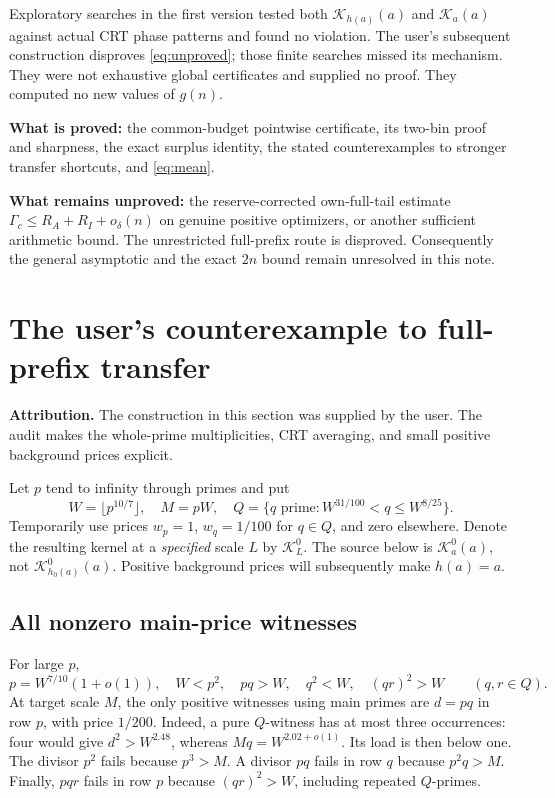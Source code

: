 \documentclass[a4paper,11pt]{article}
\theoremstyle{remark}\newtheorem{remark}[theorem]{Remark}
\newcommand{\K}{\mathcal K}
\begin{document}
Exploratory searches in the first version tested both $\K_{h(a)}(a)$ and $\K_a(a)$ against actual CRT phase patterns and found no violation. The user's subsequent construction disproves \eqref{eq:unproved}; those finite searches missed its mechanism. They were not exhaustive global certificates and supplied no proof. They computed no new values of $g(n)$.

\noindent\textbf{What is proved:} the common-budget pointwise certificate, its two-bin proof and sharpness, the exact surplus identity, the stated counterexamples to stronger transfer shortcuts, and \eqref{eq:mean}.

\medskip
\noindent\textbf{What remains unproved:} the reserve-corrected own-full-tail estimate $\Gamma_c\le R_A+R_I+o_\delta(n)$ on genuine positive optimizers, or another sufficient arithmetic bound. The unrestricted full-prefix route is disproved. Consequently the general asymptotic and the exact $2n$ bound remain unresolved in this note.

\section{The user's counterexample to full-prefix transfer}\label{sec:user-counter}
\textbf{Attribution.} The construction in this section was supplied by the user. The audit makes the whole-prime multiplicities, CRT averaging, and small positive background prices explicit.

Let $p$ tend to infinity through primes and put
\[
 W=\lfloor p^{10/7}\rfloor,\quad M=pW,\quad
 Q=\{q\text{ prime}:W^{31/100}<q\le W^{8/25}\}.
\]
Temporarily use prices $w_p=1$, $w_q=1/100$ for $q\in Q$, and zero elsewhere. Denote the resulting kernel at a \emph{specified} scale $L$ by $\K_L^0$. The source below is $\K_a^0(a)$, not $\K_{h_0(a)}^0(a)$. Positive background prices will subsequently make $h(a)=a$.

\subsection{All nonzero main-price witnesses}
For large $p$,
\[
 p=W^{7/10}(1+o(1)),\quad W<p^2,\quad pq>W,
 \quad q^2<W,\quad(qr)^2>W\qquad(q,r\in Q).
\]
At target scale $M$, the only positive witnesses using main primes are $d=pq$ in row $p$, with price $1/200$. Indeed, a pure $Q$-witness has at most three occurrences: four would give $d^2>W^{2.48}$, whereas $Mq=W^{2.02+o(1)}$. Its load is then below one. The divisor $p^2$ fails because $p^3>M$. A divisor $pq$ fails in row $q$ because $p^2q>M$. Finally, $pqr$ fails in row $p$ because $(qr)^2>W$, including repeated $Q$-primes.
\end{document}
